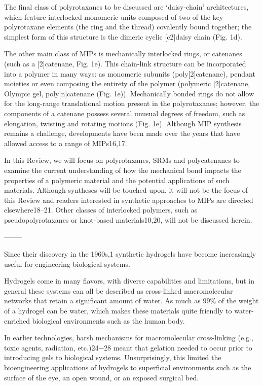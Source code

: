 \documentclass[../../main-notes.tex]{subfiles}
\begin{document}
The final class of polyrotaxanes to be discussed are ‘daisy-chain’ architectures, which feature interlocked monomeric units composed of two of the key polyrotaxane elements (the ring and the thread) covalently bound together; the simplest form of this structure is the dimeric cyclic [c2]daisy chain (Fig. 1d).

The other main class of MIPs is mechanically interlocked rings, or catenanes (such as a [2]catenane, Fig. 1e). 
This chain-link structure can be incorporated into a polymer in many ways: as monomeric subunits (poly[2]catenane), pendant moieties or even composing the entirety of the polymer (polymeric [2]catenane, Olympic gel, poly[n]catenane (Fig. 1e)). 
Mechanically bonded rings do not allow for the long-range translational motion present in the polyrotaxanes; however, the components of a catenane possess several unusual degrees of freedom, such as elongation, twisting and rotating motions (Fig. 1e). 
Although MIP synthesis remains a challenge, developments have been made over the years that have allowed access to a range of MIPs16,17. 

In this Review, we will focus on polyrotaxanes, SRMs and polycatenanes to examine the current understanding of how the mechanical bond impacts the properties of a polymeric material and the potential applications of such materials. 
Although syntheses will be touched upon, it will not be the focus of this Review and readers interested in synthetic approaches to MIPs are directed elsewhere18–21. 
Other classes of interlocked polymers, such as pseudopolyrotaxanes or knot-based materials10,20, will not be discussed herein.

--------

\citep{correaTranslationalApplicationsHydrogels2021}

Since their discovery in the 1960s,1 synthetic hydrogels have become increasingly useful for engineering biological systems.

Hydrogels come in many flavors, with diverse capabilities and limitations, but in general these systems can all be described as cross-linked macromolecular networks that retain a significant amount of water. 
As much as 99\% of the weight of a hydrogel can be water, which makes these materials quite friendly to water-enriched biological environments such as the human body. 

In earlier technologies, harsh mechanisms for macromolecular cross-linking (e.g., toxic agents, radiation,  etc.)24−28 meant that gelation needed to occur prior to introducing gels to biological systems. 
Unsurprisingly, this limited the bioengineering applications of hydrogels to superficial environments such as the surface of the eye, an open wound, or an exposed surgical bed. 
\end{document}
